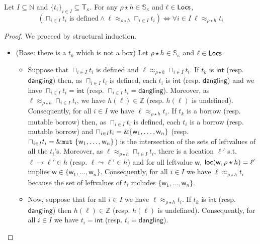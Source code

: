 \begin{lemma}\label{lem:co-additive-type}
  Let $I\subseteq\mathbb{N}$ and $\{t_i\}_{i\in I}\subseteq\mathsf{T}_\kappa$.
  For any $\rho\star h\in\mathbb{S}_\kappa$ and $\ell\in\mathsf{Locs}$,
  \[(\sqcap_{i\in I}t_i \text{ is defined} \land
  \ell\approx_{\rho\star h}\sqcap_{i\in I}t_i)
  \iff \forall i\in I\ \ell\approx_{\rho\star h}t_i\]
\end{lemma}
\begin{proof}
  We proceed by structural induction.
  \begin{itemize}
    \item (Base: there is a $t_k$ which is not a box)
    Let $\rho\star h\in\mathbb{S}_\kappa$ and $\ell\in\mathsf{Locs}$.
    \begin{itemize}
      \item Suppose that $\sqcap_{i\in I}t_i$ is defined and
      $\ell\approx_{\rho\star h}\sqcap_{i\in I}t_i$.
      If $t_k$ is $\mathsf{int}$ (resp. $\mathsf{dangling}$) then,
      as $\sqcap_{i\in I}t_i$ is defined, each $t_i$ is $\mathsf{int}$
      (resp. $\mathsf{dangling}$) and we have $\sqcap_{i\in I}t_i=\mathsf{int}$
      (resp. $\sqcap_{i\in I}t_i=\mathsf{dangling}$).
      Moreover, as $\ell\approx_{\rho\star h}\sqcap_{i\in I}t_i$, we have
      $h(\ell)\in\mathbb{Z}$ (resp. $h(\ell)$ is undefined). Consequently,
      for all $i\in I$ we have $\ell\approx_{\rho\star h}t_i$.
      If $t_k$ is a borrow (resp. mutable borrow) then, as $\sqcap_{i\in I}t_i$
      is defined, each $t_i$ is a borrow (resp. mutable borrow) and
      $\sqcap_{i\in I}t_i=\&\{\mathsf{w}_1,\ldots,\mathsf{w}_n\}$
      (resp. $\sqcap_{i\in I}t_i=\&\mathtt{mut}\ \{\mathsf{w}_1,\ldots,\mathsf{w}_n\}$)
      is the intersection of the sets of leftvalues of all the $t_i$'s. Moreover, as
      $\ell\approx_{\rho\star h}\sqcap_{i\in I}t_i$, there is a location $\ell'$
      s.t. $\ell\to\ell'\in h$ (resp. $\ell\leadsto\ell'\in h$) and
      for all leftvalue $\mathsf{w}$, $\mathsf{loc}(\mathsf{w},\rho\star h)=\ell'$
      implies $\mathsf{w}\in\{\mathsf{w}_1,\ldots,\mathsf{w}_n\}$. Consequently,
      for all $i\in I$ we have $\ell\approx_{\rho\star h}t_i$ because the set
      of leftvalues of $t_i$ includes $\{\mathsf{w}_1,\ldots,\mathsf{w}_n\}$.
      \item Now, suppose that for all $i\in I$ we have $\ell\approx_{\rho\star h}t_i$.
      If $t_k$ is $\mathsf{int}$ (resp. $\mathsf{dangling}$) then
      $h(\ell)\in\mathbb{Z}$ (resp. $h(\ell)$ is undefined). Consequently,
      for all $i\in I$ we have $t_i = \mathsf{int}$ (resp. $t_i = \mathsf{dangling}$).

\end{itemize}
\end{itemize}
\end{proof}
